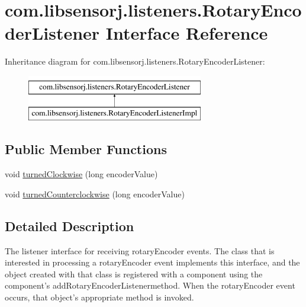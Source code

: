 \hypertarget{interfacecom_1_1libsensorj_1_1listeners_1_1RotaryEncoderListener}{}\section{com.\+libsensorj.\+listeners.\+Rotary\+Encoder\+Listener Interface Reference}
\label{interfacecom_1_1libsensorj_1_1listeners_1_1RotaryEncoderListener}
Inheritance diagram for com.\+libsensorj.\+listeners.\+Rotary\+Encoder\+Listener\+:\begin{figure}[H]
\begin{center}
\leavevmode
\includegraphics[height=2.000000cm]{interfacecom_1_1libsensorj_1_1listeners_1_1RotaryEncoderListener}
\end{center}
\end{figure}
\subsection*{Public Member Functions}
\begin{DoxyCompactItemize}
\item 
void \hyperlink{interfacecom_1_1libsensorj_1_1listeners_1_1RotaryEncoderListener_a0b7b75d6b0a30c31bd69e1674b1c98ec}{turned\+Clockwise} (long encoder\+Value)
\item 
void \hyperlink{interfacecom_1_1libsensorj_1_1listeners_1_1RotaryEncoderListener_aa04a814b5886e2fd2c095a8c2827b6a8}{turned\+Counterclockwise} (long encoder\+Value)
\end{DoxyCompactItemize}


\subsection{Detailed Description}
The listener interface for receiving rotary\+Encoder events. The class that is interested in processing a rotary\+Encoder event implements this interface, and the object created with that class is registered with a component using the component's {\ttfamily add\+Rotary\+Encoder\+Listener{\ttfamily  method. When the rotary\+Encoder event occurs, that object's appropriate method is invoked.}}

